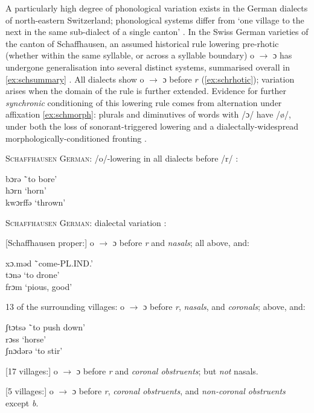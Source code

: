 A particularly high degree of phonological variation exists in the German dialects of north-eastern Switzerland; phonological systems differ from `one village to the next in the same sub-dialect of a single canton' \citep{Keel1982}. In the Swiss German varieties of the canton of Schaffhausen, an assumed historical rule lowering pre-rhotic (whether within the same syllable, or across a syllable boundary) o $\rightarrow$ ɔ has undergone generalisation into several distinct systems, summarised overall in \cref{ex:schsummary} \citep{Keel1982, JandaJoseph2003}. All dialects show o $\rightarrow$ ɔ before $r$ (\cref{ex:schrhotic}); variation arises when the domain of the rule is further extended. Evidence for further \emph{synchronic} conditioning of this lowering rule comes from alternation under affixation \cref{ex:schmorph}: plurals and diminutives of words with /ɔ/ have /ø/, under both the loss of sonorant-triggered lowering and a dialectally-widespread morphologically-conditioned fronting \citep{Garrett2014}.

\vspace{12pt}
\begin{example}\label{ex:schrhotic} \textsc{Schaffhausen German}: /o/-lowering in all dialects before /r/ \citep{Keel1982}:
\begin{tabbing}
        bɔrə \tab[3cm] \=`to bore' \\
        hɔrn \>`horn' \\
        kwɔrffə \>`thrown'
    \end{tabbing}
\end{example}

\begin{example}\label{ex:schsummary} \textsc{Schaffhausen German}: dialectal variation \citep{Keel1982}:

[Schaffhausen proper:] o $\rightarrow$ ɔ before \textit{r} and \textit{nasals}; all above, and:
\begin{tabbing}
    xɔ.məd \tab[3cm] \=`come-{\sc\scriptsize PL.IND.}' \\
    tɔnə \>`to drone' \\
    frɔm \>`pious, good'
\end{tabbing}
13 of the surrounding villages: o $\rightarrow$ ɔ before \textit{r}, \textit{nasals}, and \textit{coronals}; above, and:
\begin{tabbing}
  ʃtɔtsə \tab[3cm] \=`to push down' \\
  rɔss \>`horse' \\
  ʃnɔdərə \>`to stir'
\end{tabbing}
  [17 villages:] o $\rightarrow$ ɔ before \textit{r} and \textit{coronal obstruents}; but \textit{not} nasals.

  [5 villages:] o $\rightarrow$ ɔ before \textit{r}, \textit{coronal obstruents}, and \textit{non-coronal obstruents} except \textit{b}.

\end{example}

